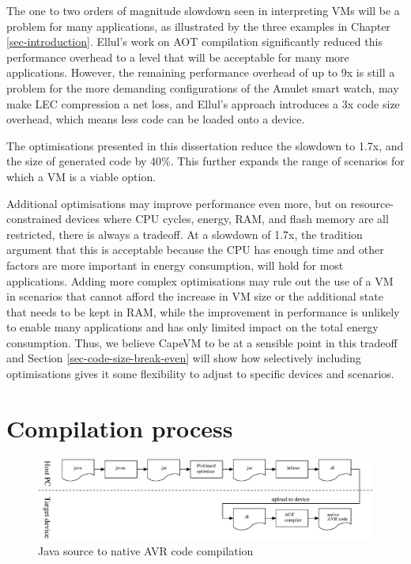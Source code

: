 The one to two orders of magnitude slowdown seen in interpreting VMs will be a problem for many applications, as illustrated by the three examples in Chapter \ref{sec-introduction}. Ellul's work \cite{Ellul:2012thesis} on AOT compilation significantly reduced this performance overhead to a level that will be acceptable for many more applications. However, the remaining performance overhead of up to 9x is still a problem for the more demanding configurations of the Amulet smart watch, may make LEC compression a net loss, and Ellul's approach introduces a 3x code size overhead, which means less code can be loaded onto a device.

The optimisations presented in this dissertation reduce the slowdown to 1.7x, and the size of generated code by 40\%. This further expands the range of scenarios for which a VM is a viable option.

Additional optimisations may improve performance even more, but on resource-constrained devices where CPU cycles, energy, RAM, and flash memory are all restricted, there is always a tradeoff. At a slowdown of 1.7x, the tradition argument that this is acceptable because the CPU has enough time and other factors are more important in energy consumption, will hold for most applications. Adding more complex optimisations may rule out the use of a VM in scenarios that cannot afford the increase in VM size or the additional state that needs to be kept in RAM, while the improvement in performance is unlikely to enable many applications and has only limited impact on the total energy consumption. Thus, we believe CapeVM to be at a sensible point in this tradeoff and Section \ref{sec-code-size-break-even} will show how selectively including optimisations gives it some flexibility to adjust to specific devices and scenarios.


\section{Compilation process}
\label{sec-compilation-process}

\begin{figure}
\includegraphics[width=\linewidth]{compilation-process.eps}
\caption{Java source to native AVR code compilation}
\label{fig-translation-process}
\end{figure}

